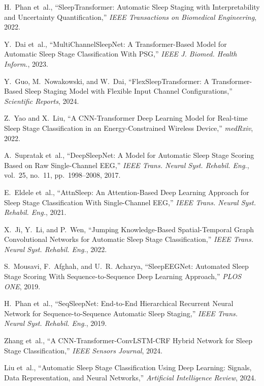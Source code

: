 \begin{thebibliography}{99}
	H.~Phan et~al., ``SleepTransformer: Automatic Sleep Staging with Interpretability and Uncertainty Quantification,'' \emph{IEEE Transactions on Biomedical Engineering}, 2022.
	
	Y.~Dai et~al., ``MultiChannelSleepNet: A Transformer-Based Model for Automatic Sleep Stage Classification With PSG,'' \emph{IEEE J. Biomed. Health Inform.}, 2023.
	
	Y.~Guo, M.~Nowakowski, and W.~Dai, ``FlexSleepTransformer: A Transformer-Based Sleep Staging Model with Flexible Input Channel Configurations,'' \emph{Scientific Reports}, 2024.
	
	Z.~Yao and X.~Liu, ``A CNN-Transformer Deep Learning Model for Real-time Sleep Stage Classification in an Energy-Constrained Wireless Device,'' \emph{medRxiv}, 2022.
	
	A.~Supratak et~al., ``DeepSleepNet: A Model for Automatic Sleep Stage Scoring Based on Raw Single-Channel EEG,'' \emph{IEEE Trans. Neural Syst. Rehabil. Eng.}, vol.~25, no.~11, pp.~1998--2008, 2017.
	
	E.~Eldele et~al., ``AttnSleep: An Attention-Based Deep Learning Approach for Sleep Stage Classification With Single-Channel EEG,'' \emph{IEEE Trans. Neural Syst. Rehabil. Eng.}, 2021.
	
	X.~Ji, Y.~Li, and P.~Wen, ``Jumping Knowledge-Based Spatial-Temporal Graph Convolutional Networks for Automatic Sleep Stage Classification,'' \emph{IEEE Trans. Neural Syst. Rehabil. Eng.}, 2022.
	
	S.~Mousavi, F.~Afghah, and U.~R. Acharya, ``SleepEEGNet: Automated Sleep Stage Scoring With Sequence-to-Sequence Deep Learning Approach,'' \emph{PLOS ONE}, 2019.
	
	H.~Phan et~al., ``SeqSleepNet: End-to-End Hierarchical Recurrent Neural Network for Sequence-to-Sequence Automatic Sleep Staging,'' \emph{IEEE Trans. Neural Syst. Rehabil. Eng.}, 2019.
	
	Zhang et~al., ``A CNN-Transformer-ConvLSTM-CRF Hybrid Network for Sleep Stage Classification,'' \emph{IEEE Sensors Journal}, 2024.
	
	Liu et~al., ``Automatic Sleep Stage Classification Using Deep Learning: Signals, Data Representation, and Neural Networks,'' \emph{Artificial Intelligence Review}, 2024.
	

\end{thebibliography}
